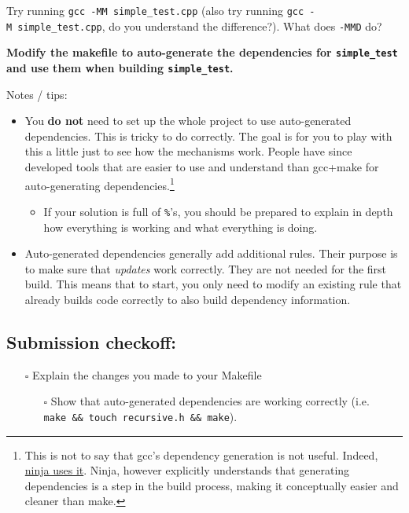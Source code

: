 \documentclass{article}
\begin{document}
Try running \texttt{gcc~-MM~simple\_test.cpp} (also try running
\texttt{gcc~-M~simple\_test.cpp}, do you understand the difference?).
What does \texttt{-MMD} do?

\textbf{Modify the makefile to auto-generate the dependencies for
  \texttt{simple\_test} and use them when building \texttt{simple\_test}.}

Notes / tips:
\begin{itemize}
  \item You \textbf{do not} need to set up the whole project to use
    auto-generated dependencies. This is tricky to do correctly.
    The goal is for you to play with this a little just to see how the
    mechanisms work. People have since developed tools that are easier to use
    and understand than gcc+make for auto-generating dependencies.\footnote{
      This is not to say that gcc's dependency generation is not useful.
      Indeed, \href{https://ninja-build.org/manual.html\#ref_headers}{ninja
        uses it}. Ninja, however explicitly understands that generating
      dependencies is a step in the build process, making it conceptually
      easier and cleaner than make.
    }
    \begin{itemize}
      \item If your solution is full of \texttt{\%}'s, you should be prepared
        to explain in depth how everything is working and what everything is
        doing.
    \end{itemize}
  \item Auto-generated dependencies generally add additional rules. Their
    purpose is to make sure that \emph{updates} work correctly. They are not
    needed for the first build. This means that to start, you only need to
    modify an existing rule that already builds code correctly to also build
    dependency information.
\end{itemize}

\subsection*{Submission checkoff:}
\begin{itemize}
  \item[$\square$] Explain the changes you made to your Makefile
    \begin{itemize}
      \item[$\square$] Show that auto-generated dependencies are working
        correctly (i.e. \texttt{make~\&\&~touch~recursive.h~\&\&~make}).
    \end{itemize}
\end{itemize}
\end{document}
